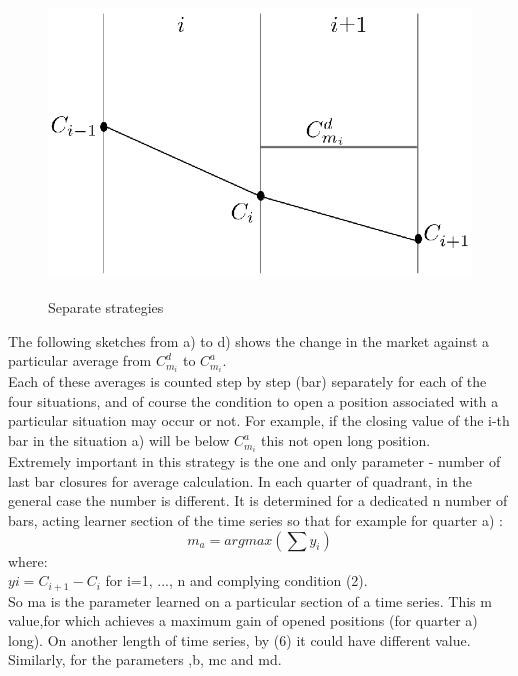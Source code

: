 \documentclass{tewiart}
\begin{document}
\begin{figure}[h]
\begin{minipage}{.49\linewidth}
\label{cztero}
\end{minipage}
\begin{minipage}{.49\linewidth}
\centering 
\includegraphics[width=\textwidth]{rysunek2d.eps}
\label{mansard}
\end{minipage}
\caption{Separate strategies}
\end{figure}
\FloatBarrier
\indent The following sketches from a) to d) shows the change in the market against a particular average from $C^d_{m_{i}}$ to $C^a_{m_{i}}$.\\
\indent Each of these averages is counted step by step (bar) separately for each of the four situations, and of course the condition to open a position associated with a particular situation may occur or not. For example, if the closing value of the i-th bar in the situation a) will be below $C^a_{m_{i}}$ this not open long position.\\
\indent Extremely important in this strategy is the one and only parameter - number of last bar closures for average calculation. In each quarter of quadrant, in the general case the number is different. It is determined for a dedicated n number of bars, acting learner section of the time series so that for example for quarter a) :\\
\begin{equation}
	m_a = argmax (\sum y_i  )
\end{equation}
where:\\
$yi = C_{i+1} - C_{i}$ for i=1, ..., n and complying  condition (2).\\
So ma is the parameter learned on a particular section of a time series. This m  value,for which achieves a maximum gain of opened positions (for quarter a) long). On another length of time series, by (6) it could have different value. Similarly, for the parameters ,b, mc and md.\\
\end{document}
